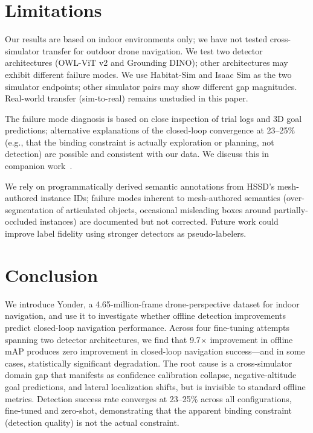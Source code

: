 \documentclass[conference]{IEEEtran}
\begin{document}
\section{Limitations}

Our results are based on indoor environments only; we have not tested cross-simulator transfer for outdoor drone navigation. We test two detector architectures (OWL-ViT v2 and Grounding DINO); other architectures may exhibit different failure modes. We use Habitat-Sim and Isaac Sim as the two simulator endpoints; other simulator pairs may show different gap magnitudes. Real-world transfer (sim-to-real) remains unstudied in this paper.

The failure mode diagnosis is based on close inspection of trial logs and 3D goal predictions; alternative explanations of the closed-loop convergence at 23--25\% (e.g., that the binding constraint is actually exploration or planning, not detection) are possible and consistent with our data. We discuss this in companion work~\cite{anon2026engineering}.

We rely on programmatically derived semantic annotations from HSSD's mesh-authored instance IDs; failure modes inherent to mesh-authored semantics (over-segmentation of articulated objects, occasional misleading boxes around partially-occluded instances) are documented but not corrected. Future work could improve label fidelity using stronger detectors as pseudo-labelers.

\section{Conclusion}

We introduce Yonder, a 4.65-million-frame drone-perspective dataset for indoor navigation, and use it to investigate whether offline detection improvements predict closed-loop navigation performance. Across four fine-tuning attempts spanning two detector architectures, we find that 9.7$\times$ improvement in offline mAP produces zero improvement in closed-loop navigation success---and in some cases, statistically significant degradation. The root cause is a cross-simulator domain gap that manifests as confidence calibration collapse, negative-altitude goal predictions, and lateral localization shifts, but is invisible to standard offline metrics. Detection success rate converges at 23--25\% across all configurations, fine-tuned and zero-shot, demonstrating that the apparent binding constraint (detection quality) is not the actual constraint.
\end{document}
